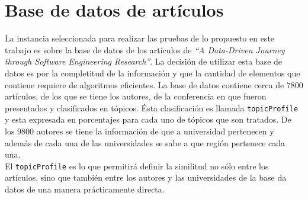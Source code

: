 \section{Base de datos de artículos}
La instancia seleccionada para realizar las pruebas de lo propuesto en este trabajo es sobre la base de datos de los artículos de \textit{\textquotedblleft A Data-Driven Journey through Software Engineering Research\textquotedblright}\cite{dataDrive}. La decisión de utilizar esta base de datos es por la completitud de la información y que la cantidad de elementos que contiene requiere de algoritmos eficientes. La base de datos contiene cerca de $7800$ artículos, de los que se tiene los autores, de la conferencia en que fueron presentados y clasificados en tópicos. Ésta clasificación es llamada \texttt{topicProfile} y esta expresada en porcentajes para cada uno de tópicos que son tratados. De los $9800$ autores se tiene la información de que a universidad pertenecen y además de cada una de las universidades se sabe a que región pertenece cada una.\\
El \texttt{topicProfile} es lo que permitirá definir la similitud no sólo entre los artículos, sino que también entre los autores y las universidades de la base da datos de una manera prácticamente directa.\\

